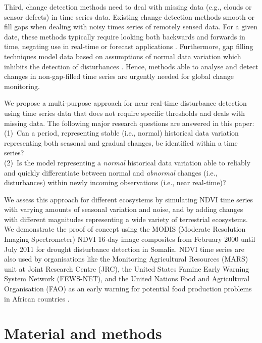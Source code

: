 \documentclass[authoryear,preprint,review,10pt]{elsarticle}
\begin{document}
Third, change detection methods need to deal with missing data (e.g., clouds or sensor defects) in time series data.
Existing change detection methods smooth or fill gaps \citep{Jonsson2002, Roerink2000, Julien2010} when dealing with noisy times series of remotely sensed data. For a given date, these methods typically require looking both backwards and forwards in time, negating use in real-time or forecast applications \citep{White2006}.  Furthermore, gap filling techniques model data based on assumptions of normal data variation which inhibits the detection of disturbances \citep{Samanta:2011hp}. Hence, methods able to analyse and detect changes in non-gap-filled time series are urgently needed for global change monitoring.

We propose a multi-purpose approach for near real-time disturbance detection using time series data that does not require specific thresholds and deals with missing data. The following major research questions are answered in this paper: \\
(1)~Can a period, representing stable (i.e., normal) historical data variation representing both seasonal and gradual changes, be identified within a time series?\\
(2)~Is the model representing a \emph{normal} historical data variation able to reliably and quickly differentiate between normal and \emph{abnormal} changes (i.e., disturbances) within newly incoming observations (i.e., near real-time)?

We assess this approach for different ecosystems by simulating NDVI time series with varying amounts of seasonal variation and noise, and by adding changes with different magnitudes representing a wide variety of terrestrial ecosystems.  We demonstrate the proof of concept using the MODIS (Moderate Resolution Imaging Spectrometer) NDVI 16-day image composites from February 2000 until July 2011 for drought disturbance detection in Somalia. NDVI time series are also used by organisations like the Monitoring Agricultural Resources (MARS) unit at Joint Research Centre (JRC), the United States Famine Early Warning System Network (FEWS-NET), and the United Nations Food and Agricultural Organisation (FAO) as an early warning for potential food production problems in African countries \citep{Rojas:2005bz}.
 
\section{Material and methods}
\end{document}
